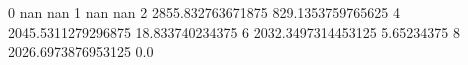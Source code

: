 0 nan nan
1 nan nan
2 2855.832763671875 829.1353759765625
4 2045.5311279296875 18.833740234375
6 2032.3497314453125 5.65234375
8 2026.6973876953125 0.0
